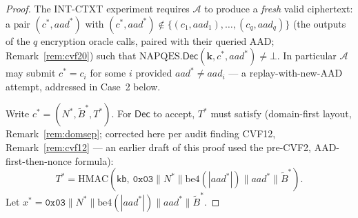 \documentclass[11pt,a4paper]{article}
\begin{document}
\begin{proof}
The INT-CTXT experiment requires $\mathcal{A}$ to produce a \emph{fresh}
valid ciphertext: a pair $(c^*, aad^*)$ with
$(c^*, aad^*) \notin \{(c_1,aad_1), \ldots, (c_q,aad_q)\}$ (the outputs of
the $q$ encryption oracle calls, paired with their queried AAD;
Remark~\ref{rem:cvf20}) such that
$\mathrm{NAPQES}.\mathsf{Dec}(\mathbf{k}, c^*, aad^*) \neq \bot$. In
particular $\mathcal{A}$ may submit $c^* = c_i$ for some $i$ provided
$aad^* \neq aad_i$ --- a replay-with-new-AAD attempt, addressed in Case~2
below.

Write $c^* = (N^*, \widetilde{B}^*, T^*)$.  For $\mathsf{Dec}$ to accept,
$T^*$ must satisfy (domain-first layout, Remark~\ref{rem:domsep};
corrected here per audit finding CVF12, Remark~\ref{rem:cvf12} --- an
earlier draft of this proof used the pre-CVF2, AAD-first-then-nonce
formula):
\[
  T^* = \mathrm{HMAC}\!\left(\mathsf{kb},\
        \texttt{0x03} \| N^* \| \mathrm{be4}(|aad^*|) \| aad^* \| \widetilde{B}^*\right).
\]
Let $x^* = \texttt{0x03} \| N^* \| \mathrm{be4}(|aad^*|) \| aad^* \| \widetilde{B}^*$.


\end{proof}
\end{document}

